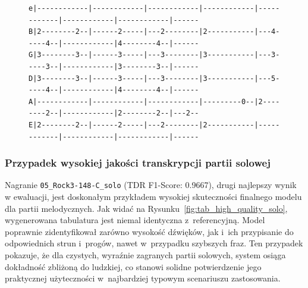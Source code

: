 \begin{figure}[H]
{\begin{verbatim}
e|------------|------------|------------|------------|------------|------------|------------|------
B|2--------2--|------2-----|---2--------|2-----------|---4-----4--|------------|4--------4--|------
G|3--------3--|------3-----|---3--------|3-----------|---3-----3--|------------|3--------3--|------
D|3--------3--|------3-----|---3--------|3-----------|---5-----4--|------------|4--------4--|------
A|------------|------------|------------|---------0--|2--------2--|------------|2--------2--|---2--
E|2--------2--|------2-----|---2--------|2-----------|------------|------------|------------|------
\end{verbatim}
    } 
\end{figure}

\subsubsection{Przypadek wysokiej jakości transkrypcji partii solowej}
\label{sssec:analiza_solo}

Nagranie \texttt{05\_Rock3-148-C\_solo} (TDR F1-Score: 0.9667), drugi najlepszy wynik w ewaluacji, jest doskonałym przykładem wysokiej skuteczności finalnego modelu dla partii melodycznych. Jak widać na Rysunku~\ref{fig:tab_high_quality_solo}, wygenerowana tabulatura jest niemal identyczna z~referencyjną. Model poprawnie zidentyfikował zarówno wysokość dźwięków, jak i~ich przypisanie do odpowiednich strun i~progów, nawet w~przypadku szybszych fraz. Ten przypadek pokazuje, że dla czystych, wyraźnie zagranych partii solowych, system osiąga dokładność zbliżoną do ludzkiej, co stanowi solidne potwierdzenie jego praktycznej użyteczności w~najbardziej typowym scenariuszu zastosowania.

